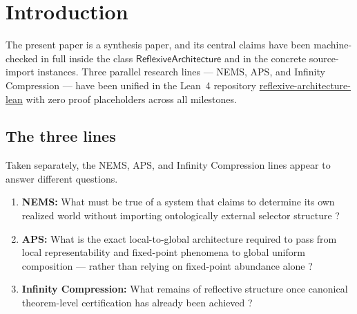 \documentclass[11pt]{article}
\newcommand{\SemRem}{\ensuremath{\mathsf{SemanticRemainder}}}
\newcommand{\RAL}{\ensuremath{\mathsf{ReflexiveArchitecture}}}
\newcommand{\EnrIrr}{\ensuremath{\mathsf{EnrichedIrreducibility}}}
\begin{document}
\begin{abstract}
The summit result is: in any architecture in $\RAL$ satisfying the Milestone~3 layered
and coherence hypotheses and carrying a remainder-bearing internal theory, outer semantic
non-exhaustion, inner enriched irreducibility, and the full inner residue package hold
simultaneously and resist joint flattening.

A fourth milestone completes the program: the \textbf{LinkedArchitecture} class
proves both coherence axioms as theorems; \textbf{CrossCorpusInstance} makes the
cross-corpus biconditional $\EnrIrr \iff \exists T,\,\SemRem(T)$ hold definitionally;
and concrete source-import instances build \textbf{ReflexiveLayer Framework} directly
from \texttt{diagonal\_barrier\_rt} (NEMS record-truth undecidability as semantic remainder)
and \textbf{CertificationLayer} from IC enriched irreducibility via T-C+.7.
Zero proof placeholders at every level.  The program is complete.
\end{abstract}

\tableofcontents
\newpage

\section{Introduction}

The present paper is a synthesis paper, and its central claims have been
machine-checked in full inside the class $\RAL$ and in the concrete source-import
instances.  Three parallel research lines --- NEMS, APS, and Infinity Compression ---
have been unified in the Lean~4 repository \url{reflexive-architecture-lean} with
zero proof placeholders across all milestones.

\subsection{The three lines}

Taken separately, the NEMS, APS, and Infinity Compression lines appear to answer
different questions.

\begin{enumerate}[leftmargin=2em]
\item \textbf{NEMS:} What must be true of a system that claims to determine its own
realized world without importing ontologically external selector structure
\cite{SpivackNEMS01-2026,SpivackNEMS08-2026}?
\item \textbf{APS:} What is the exact local-to-global architecture required to pass from
local representability and fixed-point phenomena to global uniform composition --- rather
than relying on fixed-point abundance alone \cite{SpivackAPS2026}?
\item \textbf{Infinity Compression:} What remains of reflective structure once
canonical theorem-level certification has already been achieved \cite{SpivackIC2026}?
\end{enumerate}
\end{document}
